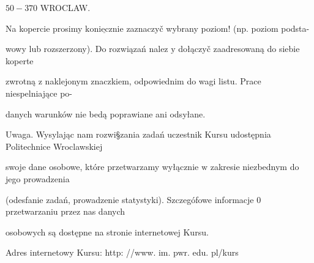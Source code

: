 \documentclass[a4paper,12pt]{article}
\begin{document}
$50-370$ WROCLAW.

Na kopercie prosimy $\underline{\mathrm{k}\mathrm{o}\mathrm{n}\mathrm{i}\mathrm{e}\mathrm{c}\mathrm{z}\mathrm{n}\mathrm{i}\mathrm{e}}$ zaznaczyč wybrany poziom! (np. poziom podsta-

wowy lub rozszerzony). Do rozwiązań nalez $\mathrm{y}$ dołączyč zaadresowaną do siebie koperte

zwrotną $\mathrm{z}$ naklejonym znaczkiem, odpowiednim do wagi listu. Prace niespelniające po-

danych warunków nie bedą poprawiane ani odsyłane.

Uwaga. Wysylając nam rozwi\S zania zadań uczestnik Kursu udostępnia Politechnice Wroclawskiej

swoje dane osobowe, które przetwarzamy wyłącznie $\mathrm{w}$ zakresie niezbednym do jego prowadzenia

(odesfanie zadań, prowadzenie statystyki). Szczegófowe informacje $0$ przetwarzaniu przez nas danych

osobowych są dostępne na stronie internetowej Kursu.

Adres internetowy Kursu: http: //www. im. pwr. edu. pl/kurs
\end{document}

